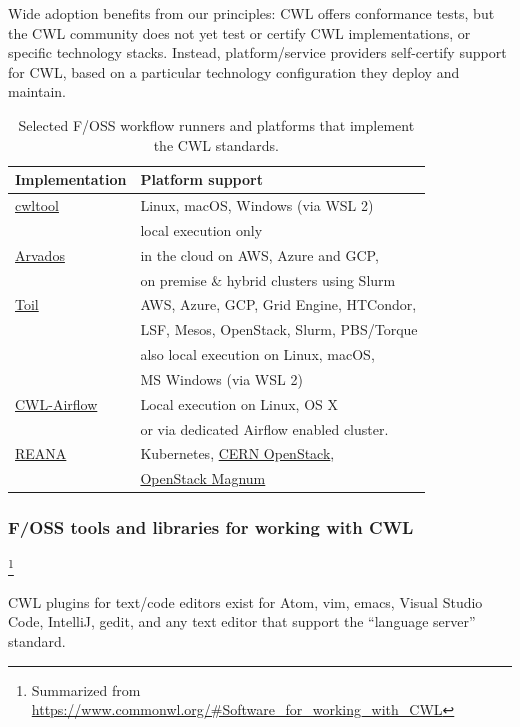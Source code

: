 \documentclass[sigconf,revew,screen,timestamp,nonacm]{acmart}
\begin{document}
Wide adoption benefits from our principles: CWL offers conformance tests, but the CWL community does not yet test or certify CWL implementations, or specific technology stacks. Instead, platform/service providers self-certify support for CWL, based on a particular technology configuration they deploy and maintain.

\begin{table}
  \caption{Selected F/OSS workflow runners and platforms that implement the CWL standards.}
  \label{tab:runners}
    \begin{tabular}{ll}
      \toprule
      Implementation & Platform support\\
      \midrule
      \href{https://pypi.org/project/cwltool}{cwltool} & Linux, macOS, Windows (via WSL 2) \\
      & local execution only\\
      \href{https://arvados.org}{Arvados} & in the cloud on AWS, Azure and GCP, \\
      & on premise \& hybrid clusters using Slurm\\
      \href{https://pypi.org/project/toil-cwl-runner}{Toil} & AWS, Azure, GCP, Grid Engine, HTCondor, \\
      & LSF, Mesos, OpenStack, Slurm, PBS/Torque\\
      & also local execution on Linux, macOS, \\
      & MS Windows (via WSL 2)\\
      \href{https://pypi.org/project/cwl-airflow}{CWL-Airflow} & Local execution on Linux, OS X\\
      & or via dedicated Airflow enabled cluster.\\
      \href{https://docs.reana.io/}{REANA} & Kubernetes, \href{https://clouddocs.web.cern.ch/clouddocs/containers/}{CERN OpenStack},\\
      & \href{https://wiki.openstack.org/wiki/Magnum}{OpenStack Magnum}\\
      \bottomrule
\end{tabular}
\end{table}

\subsubsection{F/OSS tools and libraries for working with CWL}\footnote{Summarized from \url{https://www.commonwl.org/\#Software_for_working_with_CWL}}\label{sec:sidebar:b:workwith}

CWL plugins for text/code editors exist for Atom, vim, emacs, Visual Studio Code, IntelliJ, gedit, and any text editor that support the ``language server'' standard.
\end{document}
